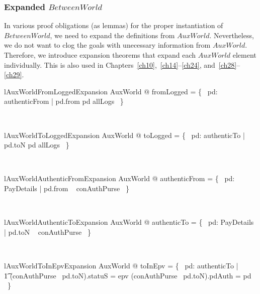 \subsubsection{Expanded $BetweenWorld$}

In various proof obligations (as lemmas) for the proper instantiation of $BetweenWorld$, we need to
expand the definitions from $AuxWorld$. Nevertheless, we do not want to clog the goals with unecessary
information from $AuxWorld$. Therefore, we introduce expansion theorems that expand each $AuxWorld$
element individually. This is also used in Chapters~\ref{ch10},~\ref{ch14}--\ref{ch24}, and~\ref{ch28}--\ref{ch29}.

\begin{LNewLemma}
\begin{theorem}{lAuxWorldFromLoggedExpansion}
    \forall  AuxWorld @ fromLogged = \{~  pd: authenticFrom | pd.from \mapsto  pd \in  allLogs ~\}
\end{theorem}~\end{LNewLemma}

\begin{LNewLemma}
\begin{theorem}{lAuxWorldToLoggedExpansion}
   \forall  AuxWorld @ toLogged = \{~  pd: authenticTo | pd.toN \mapsto  pd \in  allLogs ~\}
\end{theorem}~\end{LNewLemma}

\begin{LNewLemma}
\begin{theorem}{lAuxWorldAuthenticFromExpansion}
    \forall AuxWorld @ authenticFrom = \{~  pd: PayDetails | pd.from \in  \dom~ conAuthPurse ~\}
\end{theorem}~\end{LNewLemma}

\begin{LNewLemma}
\begin{theorem}{lAuxWorldAuthenticToExpansion}
    \forall AuxWorld @ authenticTo = \{~  pd: PayDetails | pd.toN \in  \dom~ conAuthPurse ~\}
\end{theorem}~\end{LNewLemma}

\begin{LNewLemma}
\begin{theorem}{lAuxWorldToInEpvExpansion}
    \forall  AuxWorld @ toInEpv = \{~  pd: authenticTo | \\
        \t1 (conAuthPurse~ pd.toN).statuS = epv \land  (conAuthPurse~ pd.toN).pdAuth = pd ~\}
\end{theorem}~\end{LNewLemma}

